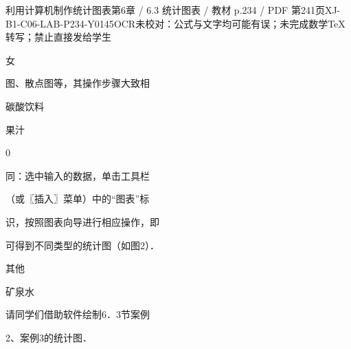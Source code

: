 \begin{bankitem}{利用计算机制作统计图表}{第6章 / 6.3 统计图表 / 教材 p.234 / PDF 第241页}{XJ-B1-C06-LAB-P234-Y0145}{OCR未校对：公式与文字均可能有误；未完成数学TeX转写；禁止直接发给学生}
\begin{ocrdraft}
女
\par
图、散点图等，其操作步骤大致相
\par
碳酸饮料
\par
果汁
\par
0
\par
同：选中输入的数据，单击工具栏
\par
（或〖插入〗菜单）中的“图表”标
\par
识，按照图表向导进行相应操作，即
\par
可得到不同类型的统计图（如图2）．
\par
其他
\par
矿泉水
\par
请同学们借助软件绘制6．3节案例
\par
2、案例3的统计图．
\end{ocrdraft}
\end{bankitem}
